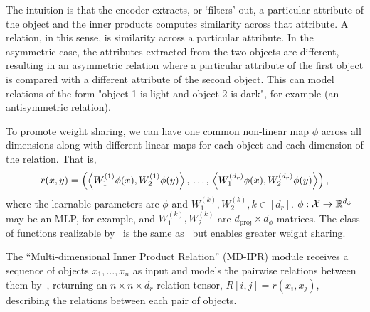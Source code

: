 The intuition is that the encoder extracts, or `filters' out, a particular attribute of the object and the inner products computes similarity across that attribute. A relation, in this sense, is similarity across a particular attribute. In the asymmetric case, the attributes extracted from the two objects are different, resulting in an asymmetric relation where a particular attribute of the first object is compared with a different attribute of the second object. This can model relations of the form "object 1 is light and object 2 is dark", for example (an antisymmetric relation).

To promote weight sharing, we can have one common non-linear map $\phi$ across all dimensions along with different linear maps for each object and each dimension of the relation. That is,
\begin{equation}\label{eq:relation_function_lin_proj}
    r(x, y) = \left(\left \langle W_1^{(1)}\phi(x), W_2^{(1)}\phi(y) \right\rangle,\, \ldots,\, \left \langle W_1^{(d_r)}\phi(x), W_2^{(d_r)}\phi(y) \right\rangle\right),
\end{equation}
where the learnable parameters are $\phi$ and $W_1^{(k)}, W_2^{(k)}, k \in [d_r]$. $\phi: {\mathcal{X}} \to \mathbb{R}^{d_\phi}$ may be an MLP, for example, and $W_1^{(k)}, W_2^{(k)}$ are $d_{\mathrm{proj}} \times d_\phi$ matrices. The class of functions realizable by~ is the same as~ but enables greater weight sharing.

The ``Multi-dimensional Inner Product Relation'' (MD-IPR) module receives a sequence of objects $x_1, \ldots, x_n$ as input and models the pairwise relations between them by~, returning an $n \times n \times d_r$ relation tensor, $R[i,j] = r(x_i, x_j)$, describing the relations between each pair of objects.

% 